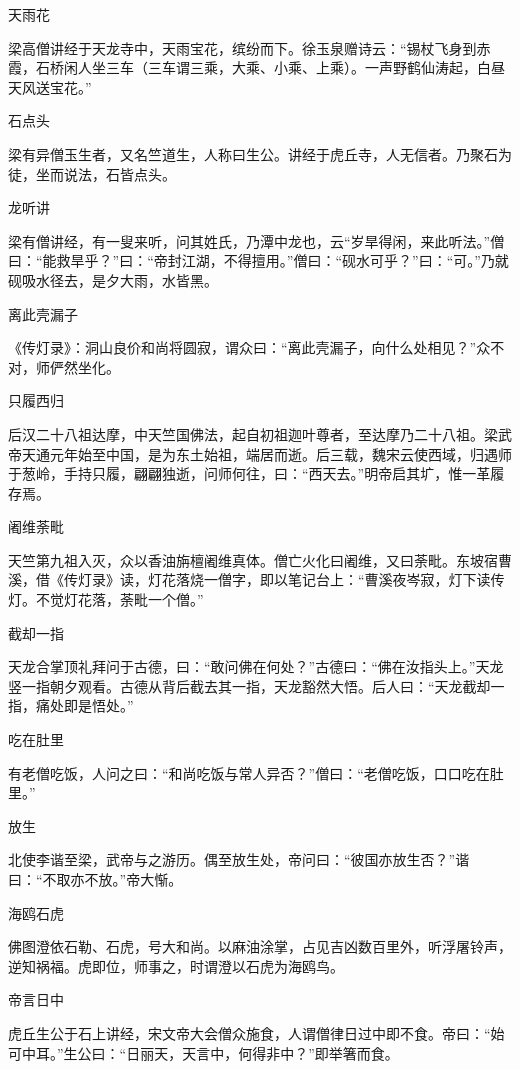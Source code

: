 \documentclass[a4paper,12pt,UTF8,twoside]{ctexbook}
\begin{document}
    天雨花
    
    梁高僧讲经于天龙寺中，天雨宝花，缤纷而下。徐玉泉赠诗云：“锡杖飞身到赤霞，石桥闲人坐三车（三车谓三乘，大乘、小乘、上乘）。一声野鹤仙涛起，白昼天风送宝花。”
    
    石点头
    
    梁有异僧玉生者，又名竺道生，人称曰生公。讲经于虎丘寺，人无信者。乃聚石为徒，坐而说法，石皆点头。
    
    龙听讲
    
    梁有僧讲经，有一叟来听，问其姓氏，乃潭中龙也，云“岁旱得闲，来此听法。”僧曰：“能救旱乎？”曰：“帝封江湖，不得擅用。”僧曰：“砚水可乎？”曰：“可。”乃就砚吸水径去，是夕大雨，水皆黑。
    
    离此壳漏子
    
    《传灯录》：洞山良价和尚将圆寂，谓众曰：“离此壳漏子，向什么处相见？”众不对，师俨然坐化。
    
    只履西归
    
    后汉二十八祖达摩，中天竺国佛法，起自初祖迦叶尊者，至达摩乃二十八祖。梁武帝天通元年始至中国，是为东土始祖，端居而逝。后三载，魏宋云使西域，归遇师于葱岭，手持只履，翩翩独逝，问师何往，曰：“西天去。”明帝启其圹，惟一革履存焉。
    
    阇维荼毗
    
    天竺第九祖入灭，众以香油旃檀阇维真体。僧亡火化曰阇维，又曰荼毗。东坡宿曹溪，借《传灯录》读，灯花落烧一僧字，即以笔记台上：“曹溪夜岑寂，灯下读传灯。不觉灯花落，荼毗一个僧。”
    
    截却一指
    
    天龙合掌顶礼拜问于古德，曰：“敢问佛在何处？”古德曰：“佛在汝指头上。”天龙竖一指朝夕观看。古德从背后截去其一指，天龙豁然大悟。后人曰：“天龙截却一指，痛处即是悟处。”
    
    吃在肚里
    
    有老僧吃饭，人问之曰：“和尚吃饭与常人异否？”僧曰：“老僧吃饭，口口吃在肚里。”
    
    放生
    
    北使李谐至梁，武帝与之游历。偶至放生处，帝问曰：“彼国亦放生否？”谐曰：“不取亦不放。”帝大惭。
    
    海鸥石虎
    
    佛图澄依石勒、石虎，号大和尚。以麻油涂掌，占见吉凶数百里外，听浮屠铃声，逆知祸福。虎即位，师事之，时谓澄以石虎为海鸥鸟。
    
    帝言日中
    
    虎丘生公于石上讲经，宋文帝大会僧众施食，人谓僧律日过中即不食。帝曰：“始可中耳。”生公曰：“日丽天，天言中，何得非中？”即举箸而食。
    
\end{document}
